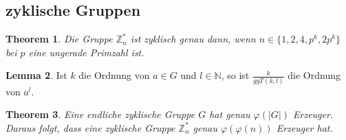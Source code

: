 \documentclass[a4paper, 12pt]{article}
\theoremstyle{plain}
\newtheorem{theorem}{Theorem}[subsection] %
\theoremstyle{definition}
\theoremstyle{lemma}
\newtheorem{lemma}[theorem]{Lemma}
\theoremstyle{remark}
\theoremstyle{corollary}
\theoremstyle{example}
\begin{document}
	\subsection{zyklische Gruppen}
	\begin{theorem}
		Die Gruppe $\mathbb{Z}_n^*$ ist zyklisch genau dann, wenn $n \in \{1,2,4,p^k,2p^k\}$ bei $p$ eine ungerade Primzahl ist.
	\end{theorem}
	\begin{lemma}
		Ist $k$ die Ordnung von $a \in G$ und $l\in \mathbb{N}$, so ist $\frac{k}{ggT(k,l)}$ die Ordnung von $a^l$.
	\end{lemma}
	\begin{theorem}
		Eine endliche zyklische Gruppe $G$ hat genau $\varphi(\left|G\right|)$ Erzeuger. Daraus folgt, dass eine zyklische Gruppe $\mathbb{Z}_n^*$ genau $\varphi(\varphi(n))$ Erzeuger hat.
	\end{theorem}
\end{document}
